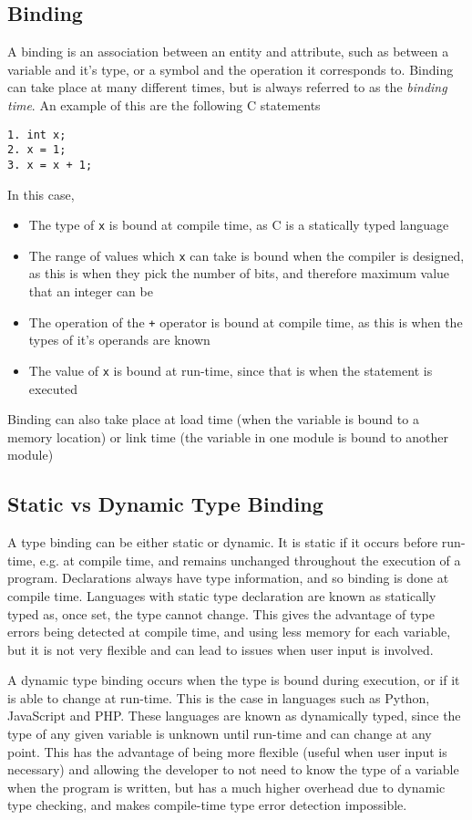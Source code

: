 \subsection*{Binding}

A binding is an association between an entity and attribute, such as between a variable and it's type, or a symbol and
 the operation it corresponds to. Binding can take place at many different times, but is always referred to as the
 \textit{binding time}. An example of this are the following C statements
\begin{verbatim}
1. int x;
2. x = 1;
3. x = x + 1;
\end{verbatim}
In this case,
\begin{itemize}
  \item The type of \verb`x` is bound at compile time, as C is a statically typed language
  \item The range of values which \verb`x` can take is bound when the compiler is designed, as this is when they pick
   the number of bits, and therefore maximum value that an integer can be
  \item The operation of the \verb`+` operator is bound at compile time, as this is when the types of it's operands are
   known
  \item The value of \verb`x` is bound at run-time, since that is when the statement is executed
\end{itemize}
Binding can also take place at load time (when the variable is bound to a memory location) or link time (the variable
 in one module is bound to another module)

\subsection*{Static vs Dynamic Type Binding}

A type binding can be either static or dynamic. It is static if it occurs before run-time, e.g. at compile time, and
 remains unchanged throughout the execution of a program. Declarations always have type information, and so binding is
 done at compile time. Languages with static type declaration are known as statically typed as, once set, the type cannot
 change. This gives the advantage of type errors being detected at compile time, and using less memory for each variable,
 but it is not very flexible and can lead to issues when user input is involved.

A dynamic type binding occurs when the type is bound during execution, or if it is able to change at run-time. This is
 the case in languages such as Python, JavaScript and PHP. These languages are known as dynamically typed, since the
 type of any given variable is unknown until run-time and can change at any point. This has the advantage of being more
 flexible (useful when user input is necessary) and allowing the developer to not need to know the type of a variable
 when the program is written, but has a much higher overhead due to dynamic type checking, and makes compile-time type
 error detection impossible.

